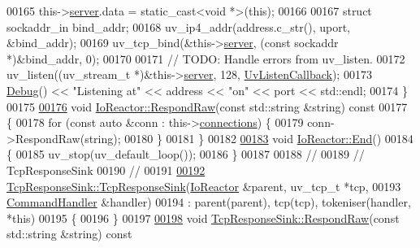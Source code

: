 \begin{DoxyCode}
00165     this->\hyperlink{classIoReactor_a4c9c61af246fda7db1bdd4e2b3170c66}{server}.data = \textcolor{keyword}{static\_cast<}\textcolor{keywordtype}{void} *\textcolor{keyword}{>}(\textcolor{keyword}{this});
00166 
00167     \textcolor{keyword}{struct }sockaddr\_in bind\_addr;
00168     uv\_ip4\_addr(address.c\_str(), uport, &bind\_addr);
00169     uv\_tcp\_bind(&this->\hyperlink{classIoReactor_a4c9c61af246fda7db1bdd4e2b3170c66}{server}, (\textcolor{keyword}{const} sockaddr *)&bind\_addr, 0);
00170 
00171     \textcolor{comment}{// TODO: Handle errors from uv\_listen.}
00172     uv\_listen((uv\_stream\_t *)&this->\hyperlink{classIoReactor_a4c9c61af246fda7db1bdd4e2b3170c66}{server}, 128, \hyperlink{io__reactor_8cpp_ab1a411534cf6420d24748b0e78927ebf}{UvListenCallback});
00173     \hyperlink{classDebug}{Debug}() << \textcolor{stringliteral}{"Listening at"} << address << \textcolor{stringliteral}{"on"} << port << std::endl;
00174 \}
00175 
\hypertarget{io__reactor_8cpp_source_l00176}{}\hyperlink{classIoReactor_a4cfe12db93bda3f7b2c29436c4969006}{00176} \textcolor{keywordtype}{void} \hyperlink{classIoReactor_a4cfe12db93bda3f7b2c29436c4969006}{IoReactor::RespondRaw}(\textcolor{keyword}{const} std::string &\textcolor{keywordtype}{string})\textcolor{keyword}{ const}
00177 \textcolor{keyword}{}\{
00178     \textcolor{keywordflow}{for} (\textcolor{keyword}{const} \textcolor{keyword}{auto} &conn : this->\hyperlink{classIoReactor_a15617cf44d3c50d5c2d31e8b1812e140}{connections}) \{
00179         conn->RespondRaw(\textcolor{keywordtype}{string});
00180     \}
00181 \}
00182 
\hypertarget{io__reactor_8cpp_source_l00183}{}\hyperlink{classIoReactor_a3566c7200adb102579d2c330a2cbf91d}{00183} \textcolor{keywordtype}{void} \hyperlink{classIoReactor_a3566c7200adb102579d2c330a2cbf91d}{IoReactor::End}()
00184 \{
00185     uv\_stop(uv\_default\_loop());
00186 \}
00187 
00188 \textcolor{comment}{//}
00189 \textcolor{comment}{// TcpResponseSink}
00190 \textcolor{comment}{//}
00191 
\hypertarget{io__reactor_8cpp_source_l00192}{}\hyperlink{classTcpResponseSink_aebb4578dd7b9ff9d414c936a27d0969f}{00192} \hyperlink{classTcpResponseSink_aebb4578dd7b9ff9d414c936a27d0969f}{TcpResponseSink::TcpResponseSink}(\hyperlink{classIoReactor}{IoReactor} &parent, uv\_tcp\_t *tcp,
00193                                  \hyperlink{classCommandHandler}{CommandHandler} &handler)
00194     : parent(parent), tcp(tcp), tokeniser(handler, *this)
00195 \{
00196 \}
00197 
\hypertarget{io__reactor_8cpp_source_l00198}{}\hyperlink{classTcpResponseSink_a20cbf1820d293f620d6ce030fd5aadc6}{00198} \textcolor{keywordtype}{void} \hyperlink{classTcpResponseSink_a20cbf1820d293f620d6ce030fd5aadc6}{TcpResponseSink::RespondRaw}(\textcolor{keyword}{const} std::string &\textcolor{keywordtype}{string})\textcolor{keyword}{ const}

\end{DoxyCode}
